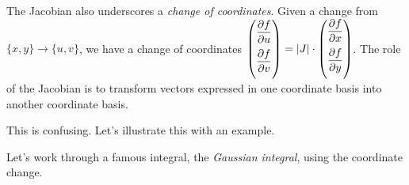 \documentclass[a4paper, 12pt,oneside,openany]{book}
\begin{document}
The Jacobian also underscores a \emph{change of coordinates}. Given a change from $\{x, y\} \to \{u, v\}$, we have a change of coordinates $ \begin{pmatrix} \medskip \dfrac{\partial f}{\partial u} \\ \medskip \dfrac{\partial f}{\partial v} \end{pmatrix} = |J| \cdot \begin{pmatrix} \medskip \dfrac{\partial f}{\partial x} \\ \medskip \dfrac{\partial f}{\partial y} \end{pmatrix}$. The role of the Jacobian is to transform vectors expressed in one coordinate basis into another coordinate basis.

This is confusing. Let's illustrate this with an example. 


Let's work through a famous integral, the \emph{Gaussian integral}, using the coordinate change.
\end{document}
